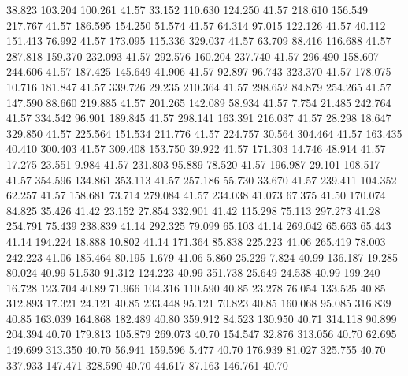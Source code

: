  38.823  103.204  100.261        41.57
  33.152  110.630  124.250        41.57
 218.610  156.549  217.767        41.57
 186.595  154.250   51.574        41.57
  64.314   97.015  122.126        41.57
  40.112  151.413   76.992        41.57
 173.095  115.336  329.037        41.57
  63.709   88.416  116.688        41.57
 287.818  159.370  232.093        41.57
 292.576  160.204  237.740        41.57
 296.490  158.607  244.606        41.57
 187.425  145.649   41.906        41.57
  92.897   96.743  323.370        41.57
 178.075   10.716  181.847        41.57
 339.726   29.235  210.364        41.57
 298.652   84.879  254.265        41.57
 147.590   88.660  219.885        41.57
 201.265  142.089   58.934        41.57
   7.754   21.485  242.764        41.57
 334.542   96.901  189.845        41.57
 298.141  163.391  216.037        41.57
  28.298   18.647  329.850        41.57
 225.564  151.534  211.776        41.57
 224.757   30.564  304.464        41.57
 163.435   40.410  300.403        41.57
 309.408  153.750   39.922        41.57
 171.303   14.746   48.914        41.57
  17.275   23.551    9.984        41.57
 231.803   95.889   78.520        41.57
 196.987   29.101  108.517        41.57
 354.596  134.861  353.113        41.57
 257.186   55.730   33.670        41.57
 239.411  104.352   62.257        41.57
 158.681   73.714  279.084        41.57
 234.038   41.073   67.375        41.50
 170.074   84.825   35.426        41.42
  23.152   27.854  332.901        41.42
 115.298   75.113  297.273        41.28
 254.791   75.439  238.839        41.14
 292.325   79.099   65.103        41.14
 269.042   65.663   65.443        41.14
 194.224   18.888   10.802        41.14
 171.364   85.838  225.223        41.06
 265.419   78.003  242.223        41.06
 185.464   80.195    1.679        41.06
   5.860   25.229    7.824        40.99
 136.187   19.285   80.024        40.99
  51.530   91.312  124.223        40.99
 351.738   25.649   24.538        40.99
 199.240   16.728  123.704        40.89
  71.966  104.316  110.590        40.85
  23.278   76.054  133.525        40.85
 312.893   17.321   24.121        40.85
 233.448   95.121   70.823        40.85
 160.068   95.085  316.839        40.85
 163.039  164.868  182.489        40.80
 359.912   84.523  130.950        40.71
 314.118   90.899  204.394        40.70
 179.813  105.879  269.073        40.70
 154.547   32.876  313.056        40.70
  62.695  149.699  313.350        40.70
  56.941  159.596    5.477        40.70
 176.939   81.027  325.755        40.70
 337.933  147.471  328.590        40.70
  44.617   87.163  146.761        40.70
